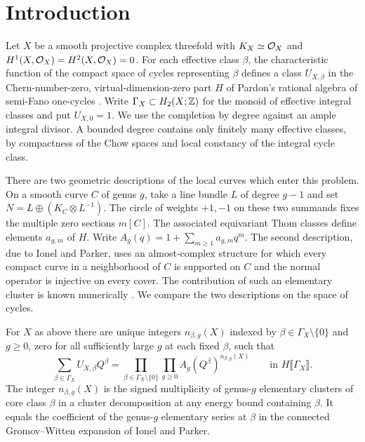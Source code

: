 \section{Introduction}\label{sec:intro}

Let $X$ be a smooth projective complex threefold with $K_X\simeq\mathcal O_X$
and $H^1(X,\mathcal O_X)=H^2(X,\mathcal O_X)=0$. For each effective class $\beta$, the characteristic function of the
compact space of cycles representing $\beta$ defines a class $U_{X,\beta}$ in
the Chern-number-zero, virtual-dimension-zero part $H$ of Pardon's rational
algebra of semi-Fano one-cycles \cite[\S\S2--3]{Pardon}. Write
$\Gamma_X\subset H_2(X;\mathbb Z)$ for the monoid of effective integral classes
and put $U_{X,0}=1$. We use the completion by degree against an ample
integral divisor. A bounded degree contains only finitely many effective
classes, by compactness of the Chow spaces and local constancy of the
integral cycle class.

There are two geometric descriptions of the local curves which enter
this problem. On a smooth curve $C$ of genus $g$, take a line bundle $L$
of degree $g-1$ and set $N=L\oplus(K_C\otimes L^{-1})$. The circle of
weights $+1,-1$ on these two summands fixes the multiple zero sections
$m[C]$. The associated equivariant Thom classes define elements
$a_{g,m}$ of $H$. Write $A_g(q)=1+\sum_{m\ge1}a_{g,m}q^m$.
The second description, due to Ionel and Parker, uses an almost-complex
structure for which every compact curve in a neighborhood of $C$ is
supported on $C$ and the normal operator is injective on every cover.
The contribution of such an elementary cluster is known numerically
\cite[\S3]{IP}. We compare the two descriptions on the space of cycles.

\begin{theorem}\label{thm:main}
For $X$ as above there are unique integers $n_{\beta,g}(X)$ indexed by
$\beta\in\Gamma_X\setminus\{0\}$ and $g\ge0$, zero for all
sufficiently large $g$ at each fixed $\beta$, such that
\begin{equation}\label{eq:product}
 \sum_{\beta\in\Gamma_X}U_{X,\beta}Q^\beta
 =\prod_{\beta\in\Gamma_X\setminus\{0\}}\prod_{g\ge0}
       A_g(Q^\beta)^{n_{\beta,g}(X)}
 \qquad\text{in }H\llbracket\Gamma_X\rrbracket .
\end{equation}
The integer $n_{\beta,g}(X)$ is the signed multiplicity of genus-$g$
elementary clusters of core class $\beta$ in a cluster decomposition
at any energy bound containing $\beta$. It equals the coefficient of
the genus-$g$ elementary series at $\beta$ in the connected
Gromov--Witten expansion of Ionel and Parker.
\end{theorem}

